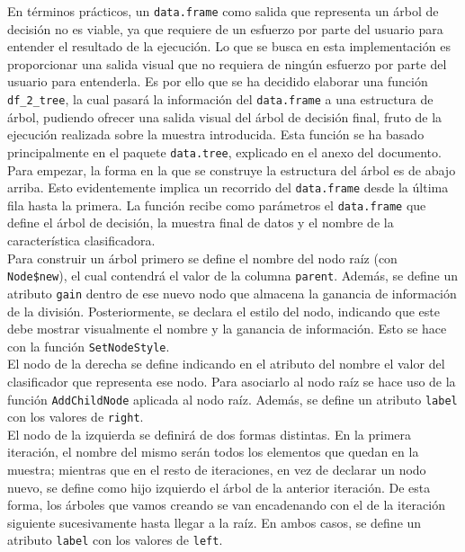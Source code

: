 \documentclass[12pt]{report}\usepackage[]{graphicx}\usepackage[dvipsnames]{xcolor}
\begin{document}
	 			En términos prácticos, un \texttt{data.frame} como salida que representa un árbol de decisión no es viable, ya que requiere de un esfuerzo por parte del usuario para entender el resultado de la ejecución. Lo que se busca en esta implementación es proporcionar una salida visual que no requiera de ningún esfuerzo por parte del usuario para entenderla. Es por ello que se ha decidido elaborar una función \texttt{df\_2\_tree}, la cual pasará la información del \texttt{data.frame} a una estructura de árbol, pudiendo ofrecer una salida visual del árbol de decisión final, fruto de la ejecución realizada sobre la muestra introducida. Esta función se ha basado principalmente en el paquete \texttt{data.tree}, explicado en el anexo del documento.\\
	 			
	 			Para empezar, la forma en la que se construye la estructura del árbol es de abajo arriba. Esto evidentemente implica un recorrido del \texttt{data.frame} desde la última fila hasta la primera. La función recibe como parámetros el \texttt{data.frame} que define el árbol de decisión, la muestra final de datos y el nombre de la característica clasificadora.\\
	 			
	 			Para construir un árbol primero se define el nombre del nodo raíz (con \texttt{Node\$new}), el cual contendrá el valor de la columna \texttt{parent}. Además, se define un atributo \texttt{gain} dentro de ese nuevo nodo que almacena la ganancia de información de la división. Posteriormente, se declara el estilo del nodo, indicando que este debe mostrar visualmente el nombre y la ganancia de información. Esto se hace con la función \texttt{SetNodeStyle}.\\
	 			
	 			El nodo de la derecha se define indicando en el atributo del nombre el valor del clasificador que representa ese nodo. Para asociarlo al nodo raíz se hace uso de la función \texttt{AddChildNode} aplicada al nodo raíz. Además, se define un atributo \texttt{label} con los valores de \texttt{right}.\\
	 			
	 			El nodo de la izquierda se definirá de dos formas distintas. En la primera iteración, el nombre del mismo serán todos los elementos que quedan en la muestra; mientras que en el resto de iteraciones, en vez de declarar un nodo nuevo, se define como hijo izquierdo el árbol de la anterior iteración. De esta forma, los árboles que vamos creando se van encadenando con el de la iteración siguiente sucesivamente hasta llegar a la raíz. En ambos casos, se define un atributo \texttt{label} con los valores de \texttt{left}.\\
	 			
\end{document}
